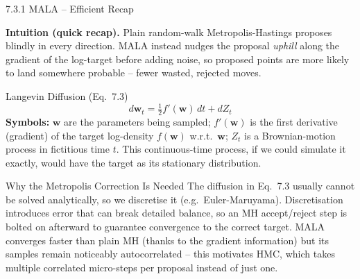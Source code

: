 \documentclass[aspectratio=169,10pt]{beamer}
\newcommand{\bw}{\mathbf{w}}
\begin{document}
\begin{frame}[allowframebreaks]{7.3.1 MALA -- Efficient Recap}

\textbf{Intuition (quick recap).} Plain random-walk Metropolis-Hastings proposes blindly in every direction. MALA instead nudges the proposal \emph{uphill} along the gradient of the log-target before adding noise, so proposed points are more likely to land somewhere probable -- fewer wasted, rejected moves.

\begin{block}{Langevin Diffusion (Eq.~7.3)}
\[
  d\bw_t = \tfrac{1}{2} f'(\bw)\, dt + dZ_t
\]
\textbf{Symbols:} $\bw$ are the parameters being sampled; $f'(\bw)$ is the first derivative (gradient) of the target log-density $f(\bw)$ w.r.t.\ $\bw$; $Z_t$ is a Brownian-motion process in fictitious time $t$. This continuous-time process, if we could simulate it exactly, would have the target as its stationary distribution.
\end{block}

\begin{block}{Why the Metropolis Correction Is Needed}
The diffusion in Eq.~7.3 usually cannot be solved analytically, so we discretise it (e.g.\ Euler-Maruyama). Discretisation introduces error that can break detailed balance, so an MH accept/reject step is bolted on afterward to guarantee convergence to the correct target. MALA converges faster than plain MH (thanks to the gradient information) but its samples remain noticeably autocorrelated -- this motivates HMC, which takes multiple correlated micro-steps per proposal instead of just one.
\end{block}

\end{frame}
\end{document}
